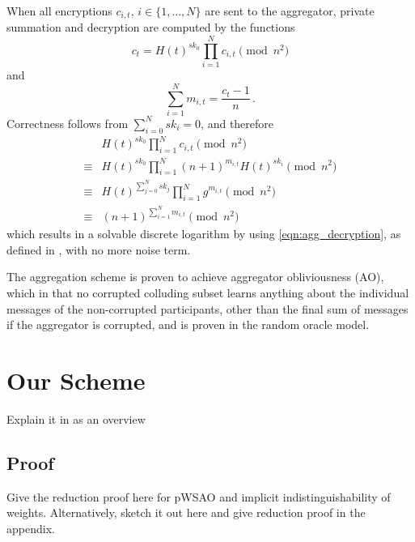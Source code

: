 \documentclass[twocolumn]{autart}    %
\begin{document}
When all encryptions $c_{i,t},\,i \in \{1,\dots,N\}$ are sent to the aggregator, private summation and decryption are computed by the functions
\begin{equation}
    c_{t} = H(t)^{sk_0}\prod^{N}_{i=1}c_{i,t} \pmod{n^2}
\end{equation}
and
\begin{equation}
    \sum^{N}_{i=1}m_{i,t} = \frac{c_{t}-1}{n}\,. \label{eqn:agg_decryption}
\end{equation}
Correctness follows from $\sum^{N}_{i=0}sk_i = 0$, and therefore
\begin{align}
    &H(t)^{sk_0}\prod^{N}_{i=1}c_{i,t} \pmod{n^2} \\
    \equiv &H(t)^{sk_0}\prod^{N}_{i=1}(n+1)^{m_{i,t}} H(t)^{sk_i} \pmod{n^2} \\
    \equiv &H(t)^{\sum^N_{j=0}sk_j} \prod^{N}_{i=1}g^{m_{i,t}} \pmod{n^2} \\
    \equiv &(n+1)^{\sum^N_{i=1}m_{i,t}} \pmod{n^2}
\end{align}
which results in a solvable discrete logarithm by using \eqref{eqn:agg_decryption}, as defined in \cite{joyeScalableSchemePrivacyPreserving2013}, with no more noise term.

The aggregation scheme is proven to achieve aggregator obliviousness (AO), which in that no corrupted colluding subset learns anything about the individual messages of the non-corrupted participants, other than the final sum of messages if the aggregator is corrupted, and is proven in the random oracle model.

\section{Our Scheme}
Explain it in as an overview


\subsection{Proof}
Give the reduction proof here for pWSAO and implicit indistinguishability of weights. Alternatively, sketch it out here and give reduction proof in the appendix.
\end{document}
